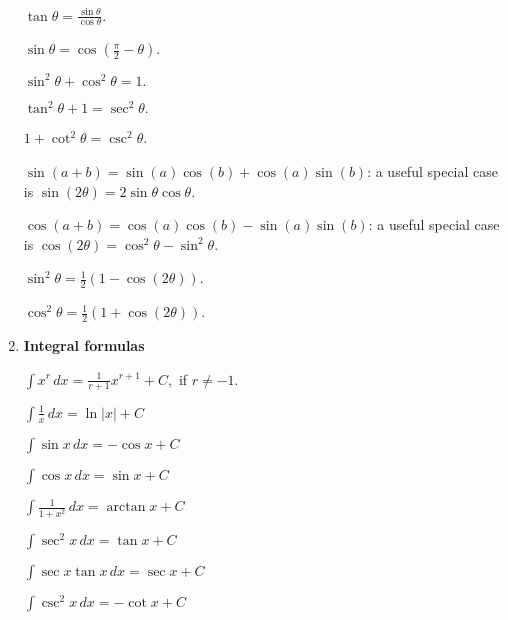 \documentclass[11 pt]{report}
\begin{document}
\begin{enumerate}
$\tan \theta = \frac{\sin \theta}{\cos \theta}.$

\vspace{5pt}

$\sin \theta = \cos(\frac{\pi}{2} - \theta)$. 

\vspace{5pt}

$\sin^2 \theta+\cos^2 \theta = 1.$
\vspace{5pt}

$\tan^2\theta+1 = \sec^2 \theta.$
\vspace{5pt}

$1+ \cot^2 \theta = \csc^2 \theta$. 
\vspace{5pt}

$\sin(a+b) = \sin(a)\cos(b) + \cos(a)\sin(b)$: a useful special case is $\sin(2\theta) = 2\sin\theta\cos\theta$.
\vspace{5pt}

$\cos(a+b) = \cos(a)\cos(b) - \sin(a) \sin(b)$: a useful special case is $\cos(2\theta) = \cos^2\theta -\sin^2\theta$. 
\vspace{5pt}

$\sin^2 \theta = \frac{1}{2}(1-\cos(2\theta))$.
\vspace{5pt}

$\cos^2 \theta = \frac{1}{2}(1+\cos(2\theta))$. 

\vspace{10pt} 

\item[] \textbf{Integral formulas} 

$\int x^r \, dx  = \frac{1}{r+1} x^{r+1} + C,$ if $r \neq -1$. 
\vspace{5pt}

$\int \frac{1}{x} \, dx = \ln | x| + C$
\vspace{5pt}

$\int \sin x \, dx = -\cos x + C$
\vspace{5pt}

$\int \cos x \, dx = \sin x + C$
\vspace{5pt}

$\int \frac{1}{1+x^2} \, dx = \arctan x + C$
\vspace{5pt}

$\int \sec^2 x \, dx = \tan x + C$
\vspace{5pt}

$\int \sec x \tan x \, dx = \sec x + C$
\vspace{5pt}

$\int \csc^2 x \, dx = - \cot x + C$


\end{enumerate}
\end{document}
